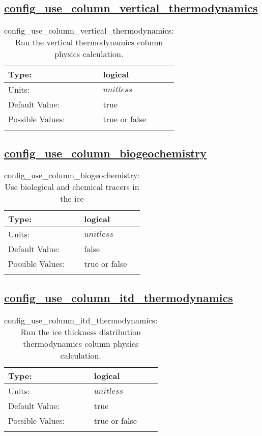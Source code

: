 \subsection[config\_use\_column\_vertical\_thermodynamics]{\hyperref[sec:nm_tab_column_package]{config\_use\_column\_vertical\_thermodynamics}}
\label{subsec:nm_sec_config_use_column_vertical_thermodynamics}
\begin{center}
\begin{longtable}{| p{2.0in} || p{4.0in} |}
    \hline
    Type: & logical \\
    \hline
    Units: & $unitless$ \\
    \hline
    Default Value: & true \\
    \hline
    Possible Values: & true or false \\
    \hline
    \caption{config\_use\_column\_vertical\_thermodynamics: Run the vertical thermodynamics column physics calculation.}
\end{longtable}
\end{center}
\subsection[config\_use\_column\_biogeochemistry]{\hyperref[sec:nm_tab_column_package]{config\_use\_column\_biogeochemistry}}
\label{subsec:nm_sec_config_use_column_biogeochemistry}
\begin{center}
\begin{longtable}{| p{2.0in} || p{4.0in} |}
    \hline
    Type: & logical \\
    \hline
    Units: & $unitless$ \\
    \hline
    Default Value: & false \\
    \hline
    Possible Values: & true or false \\
    \hline
    \caption{config\_use\_column\_biogeochemistry: Use biological and chemical tracers in the ice}
\end{longtable}
\end{center}
\subsection[config\_use\_column\_itd\_thermodynamics]{\hyperref[sec:nm_tab_column_package]{config\_use\_column\_itd\_thermodynamics}}
\label{subsec:nm_sec_config_use_column_itd_thermodynamics}
\begin{center}
\begin{longtable}{| p{2.0in} || p{4.0in} |}
    \hline
    Type: & logical \\
    \hline
    Units: & $unitless$ \\
    \hline
    Default Value: & true \\
    \hline
    Possible Values: & true or false \\
    \hline
    \caption{config\_use\_column\_itd\_thermodynamics: Run the ice thickness distribution thermodynamics column physics calculation.}
\end{longtable}
\end{center}
